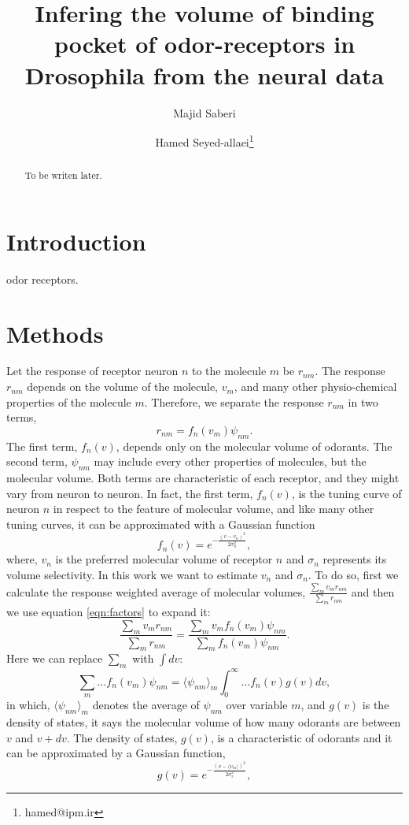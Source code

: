 \documentclass[11pt]{paper} %
\title{Infering the volume of binding pocket of odor-receptors in Drosophila from the neural data}
\author{Majid Saberi \and Hamed Seyed-allaei\thanks{hamed@ipm.ir}}
\begin{document}
\maketitle
\begin{abstract}
To be writen later.
\end{abstract}

\section{Introduction}

odor receptors.

\section{Methods}

Let the response of receptor neuron $n$ to the molecule $m$ be $r_{nm}$. 
The response $r_{nm}$ depends on the volume of the molecule, $v_m$, 
and many other physio-chemical properties of the molecule $m$.
Therefore, we separate the response $r_{nm}$ in two terms, 
\begin{equation}
r_{nm} = f_n(v_m) \psi_{nm}.
\label{eqn:factors}
\end{equation}
The first term, $f_n(v)$, depends only on the molecular volume of odorants.
The second term, $\psi_{nm}$ may include every other properties of molecules, but the molecular volume.
Both terms are characteristic of each receptor, and they might vary from neuron to neuron.
In fact, the first term, $f_n(v)$, is the tuning curve of neuron $n$ in respect to the feature of molecular volume, 
and like many other tuning curves, it can be approximated with a Gaussian function
\[
\displaystyle f_n(v) = e^{-\frac{(v-v_n)^2}{2\sigma^2_n}}, 
\]
where, $v_n$ is the preferred molecular volume of receptor $n$ and $\sigma_n$ represents its volume selectivity. 
In this work we want to estimate $v_n$ and $\sigma_n$. 
To do so, first we calculate the response weighted average of molecular volumes, 
$\frac{\sum_m v_m r_{nm}}{\sum_m r_{nm}}$ and then we use equation \ref{eqn:factors} to expand it:
\[
\frac{\displaystyle \sum_m v_m r_{nm}}{\displaystyle \sum_m r_{nm}} = \frac{\displaystyle \sum_m v_m f_n(v_m) \psi_{nm}}{\displaystyle \sum_m f_n(v_m) \psi_{nm}}.
\]
Here we can replace $\sum_m$ with $\int dv$:
\[
\sum_m \dots f_n(v_m) \psi_{nm} =  \langle \psi_{nm} \rangle_m \int_0^\infty \dots f_n(v) g(v)  dv, 
\]
in which, $\langle \psi_{nm} \rangle_m$ denotes the average of $\psi_{nm}$ over variable $m$, 
and $g(v)$ is the density of states, it says the molecular volume of how many odorants are between $v$ and $v+dv$.
The density of states, $g(v)$, is a characteristic of odorants and it can be approximated by a Gaussian function, 
\[
\displaystyle g(v) = e^{-\frac{(v- \langle v_m \rangle)^2}{2\sigma_{v}^2}},
\]
\end{document}
